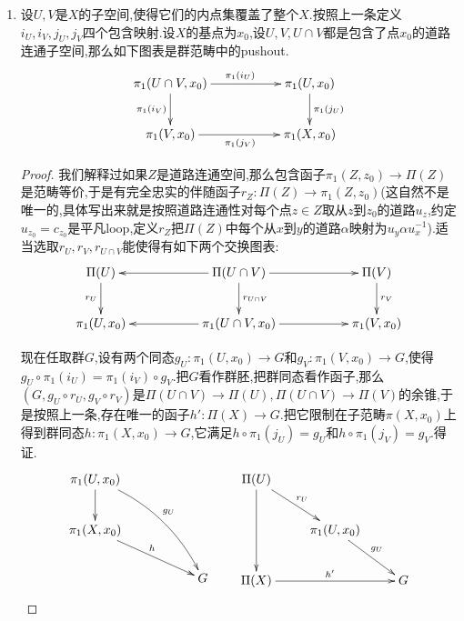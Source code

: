 \begin{enumerate}
\begin{proof}
		于是如果$h$存在那么必须要满足如下等式,这说明$h$如果存在则必须唯一.
		$$h[w]=h_{\gamma(m)}[w_m]\circ\cdots\circ h_{\gamma(0)}[w_0]$$
		
		为了说明存在性就要说明这个定义的良性,也就是要说明无论我们改变等分点的选取,还是改变道路同伦类$[w]$的代表元$w$,得到的结果都是同伦的.第一个问题只要把两种分割合并为一个分割即可.第二个问题可以把$[0,1]\times[0,1]$等分为足够小的小正方形,使得每个小正方形在同伦下打到$U^{\circ}$或者$V^{\circ}$中.
	\end{proof}
    \item 设$U,V$是$X$的子空间,使得它们的内点集覆盖了整个$X$.按照上一条定义$i_U,i_V,j_U,j_V$四个包含映射.设$X$的基点为$x_0$,设$U,V,U\cap V$都是包含了点$x_0$的道路连通子空间,那么如下图表是群范畴中的pushout.
    $$\xymatrix{\pi_1(U\cap V,x_0)\ar[rr]^{\pi_1(i_U)}\ar[d]_{\pi_1(i_V)}&&\pi_1(U,x_0)\ar[d]^{\pi_1(j_U)}\\\pi_1(V,x_0)\ar[rr]_{\pi_1(j_V)}&&\pi_1(X,x_0)}$$
    \begin{proof}
    	
    	我们解释过如果$Z$是道路连通空间,那么包含函子$\pi_1(Z,z_0)\to\Pi(Z)$是范畴等价,于是有完全忠实的伴随函子$r_Z:\Pi(Z)\to\pi_1(Z,z_0)$(这自然不是唯一的,具体写出来就是按照道路连通性对每个点$z\in Z$取从$z$到$z_0$的道路$u_z$,约定$u_{z_0}=c_{z_0}$是平凡loop,定义$r_Z$把$\Pi(Z)$中每个从$x$到$y$的道路$\alpha$映射为$u_y\alpha u_x^{-1}$).适当选取$r_U,r_V,r_{U\cap V}$能使得有如下两个交换图表:
    	$$\xymatrix{\Pi(U)\ar[d]_{r_U}&&\Pi(U\cap V)\ar[ll]\ar[rr]\ar[d]^{r_{U\cap V}}&&\Pi(V)\ar[d]^{r_V}\\\pi_1(U,x_0)&&\pi_1(U\cap V,x_0)\ar[rr]\ar[ll]&&\pi_1(V,x_0)}$$
    	
    	现在任取群$G$,设有两个同态$g_U:\pi_1(U,x_0)\to G$和$g_V:\pi_1(V,x_0)\to G$,使得$g_U\circ\pi_1(i_U)=\pi_1(i_V)\circ g_V$.把$G$看作群胚,把群同态看作函子,那么$(G,g_U\circ r_U,g_V\circ r_V)$是$\Pi(U\cap V)\to\Pi(U),\Pi(U\cap V)\to\Pi(V)$的余锥,于是按照上一条,存在唯一的函子$h':\Pi(X)\to G$.把它限制在子范畴$\pi(X,x_0)$上得到群同态$h:\pi_1(X,x_0)\to G$,它满足$h\circ\pi_1(j_U)=g_U$和$h\circ\pi_1(j_V)=g_V$.得证.
    	$$\xymatrix{\pi_1(U,x_0)\ar[d]\ar@/^1pc/[ddrr]^{g_U}&&\\\pi_1(X,x_0)\ar[drr]^h&&\\&&G}\qquad\xymatrix{\Pi(U)\ar[dd]\ar[dr]^{r_U}&&\\&\pi_1(U,x_0)\ar[dr]^{g_U}&\\\Pi(X)\ar[rr]^{h'}&&G}$$
    \end{proof}
\end{enumerate}

